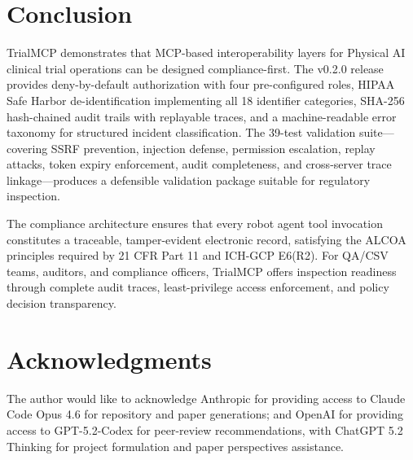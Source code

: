 \documentclass[10pt,letterpaper]{article}
\begin{document}
\section{Conclusion}

TrialMCP demonstrates that MCP-based interoperability layers for Physical AI clinical trial operations can be designed compliance-first. The v0.2.0 release provides deny-by-default authorization with four pre-configured roles, HIPAA Safe Harbor de-identification implementing all 18 identifier categories, SHA-256 hash-chained audit trails with replayable traces, and a machine-readable error taxonomy for structured incident classification. The 39-test validation suite---covering SSRF prevention, injection defense, permission escalation, replay attacks, token expiry enforcement, audit completeness, and cross-server trace linkage---produces a defensible validation package suitable for regulatory inspection.

The compliance architecture ensures that every robot agent tool invocation constitutes a traceable, tamper-evident electronic record, satisfying the ALCOA principles required by 21 CFR Part 11 and ICH-GCP E6(R2). For QA/CSV teams, auditors, and compliance officers, TrialMCP offers inspection readiness through complete audit traces, least-privilege access enforcement, and policy decision transparency.




\section*{Acknowledgments}

The author would like to acknowledge Anthropic for providing access to Claude Code Opus 4.6 for repository and paper generations; and OpenAI for providing access to GPT-5.2-Codex for peer-review recommendations, with ChatGPT 5.2 Thinking for project formulation and paper perspectives assistance.
\end{document}

